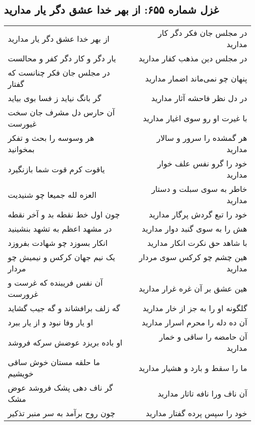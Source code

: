 \begin{center}
\section*{غزل شماره ۶۵۵: از بهر خدا عشق دگر یار مدارید}
\label{sec:0655}
\begin{longtable}{l p{0.5cm} r}
از بهر خدا عشق دگر یار مدارید
&&
در مجلس جان فکر دگر کار مدارید
\\
یار دگر و کار دگر کفر و محالست
&&
در مجلس دین مذهب کفار مدارید
\\
در مجلس جان فکر چنانست که گفتار
&&
پنهان چو نمی‌ماند اضمار مدارید
\\
گر بانگ نیاید ز فسا بوی بیاید
&&
در دل نظر فاحشه آثار مدارید
\\
آن حارس دل مشرف جان سخت غیورست
&&
با غیرت او رو سوی اغیار مدارید
\\
هر وسوسه را بحث و تفکر بمخوانید
&&
هر گمشده را سرور و سالار مدارید
\\
یاقوت کرم قوت شما بازنگیرد
&&
خود را گرو نفس علف خوار مدارید
\\
العزه لله جمیعا چو شنیدیت
&&
خاطر به سوی سبلت و دستار مدارید
\\
چون اول خط نقطه بد و آخر نقطه
&&
خود را تبع گردش پرگار مدارید
\\
در مشهد اعظم به تشهد بنشینید
&&
هش را به سوی گنبد دوار مدارید
\\
انکار بسوزد چو شهادت بفروزد
&&
با شاهد حق نکرت انکار مدارید
\\
یک نیم جهان کرکس و نیمیش چو مردار
&&
هین چشم چو کرکس سوی مردار مدارید
\\
آن نفس فریبنده که غرست و غرورست
&&
هین عشق بر آن غره غرار مدارید
\\
گه زلف برافشاند و گه جیب گشاید
&&
گلگونه او را به جز از خار مدارید
\\
او یار وفا نبود و از یار ببرد
&&
آن ده دله را محرم اسرار مدارید
\\
او باده بریزد عوضش سرکه فروشد
&&
آن حامضه را ساقی و خمار مدارید
\\
ما حلقه مستان خوش ساقی خویشیم
&&
ما را سقط و بارد و هشیار مدارید
\\
گر ناف دهی پشک فروشد عوض مشک
&&
آن ناف ورا نافه تاتار مدارید
\\
چون روح برآمد به سر منبر تذکیر
&&
خود را سپس پرده گفتار مدارید
\\
\end{longtable}
\end{center}
